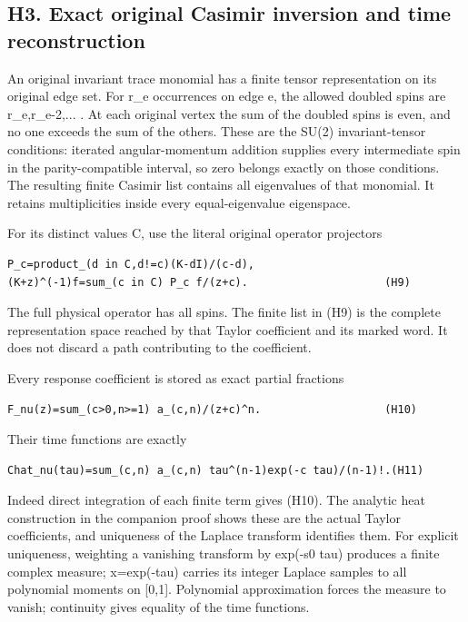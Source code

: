 \documentclass[11pt,a4paper]{article}
\renewcommand{\[}{\begingroup\small\originaldisplaystart}
\renewcommand{\]}{\originaldisplayend\endgroup}
\begin{document}
\subsection{H3. Exact original Casimir inversion and time
reconstruction}\label{h3.-exact-original-casimir-inversion-and-time-reconstruction}

An original invariant trace monomial has a finite tensor representation
on its original edge set. For r\_e occurrences on edge e, the allowed
doubled spins are r\_e,r\_e-2,... . At each original vertex the sum of
the doubled spins is even, and no one exceeds the sum of the others.
These are the SU(2) invariant-tensor conditions: iterated
angular-momentum addition supplies every intermediate spin in the
parity-compatible interval, so zero belongs exactly on those conditions.
The resulting finite Casimir list contains all eigenvalues of that
monomial. It retains multiplicities inside every equal-eigenvalue
eigenspace.

For its distinct values C, use the literal original operator projectors

\begin{verbatim}
P_c=product_(d in C,d!=c)(K-dI)/(c-d),
(K+z)^(-1)f=sum_(c in C) P_c f/(z+c).                     (H9)
\end{verbatim}

The full physical operator has all spins. The finite list in (H9) is the
complete representation space reached by that Taylor coefficient and its
marked word. It does not discard a path contributing to the coefficient.

Every response coefficient is stored as exact partial fractions

\begin{verbatim}
F_nu(z)=sum_(c>0,n>=1) a_(c,n)/(z+c)^n.                   (H10)
\end{verbatim}

Their time functions are exactly

\begin{verbatim}
Chat_nu(tau)=sum_(c,n) a_(c,n) tau^(n-1)exp(-c tau)/(n-1)!.(H11)
\end{verbatim}

Indeed direct integration of each finite term gives (H10). The analytic
heat construction in the companion proof shows these are the actual
Taylor coefficients, and uniqueness of the Laplace transform identifies
them. For explicit uniqueness, weighting a vanishing transform by
exp(-s0 tau) produces a finite complex measure; x=exp(-tau) carries its
integer Laplace samples to all polynomial moments on {[}0,1{]}.
Polynomial approximation forces the measure to vanish; continuity gives
equality of the time functions.
\end{document}
